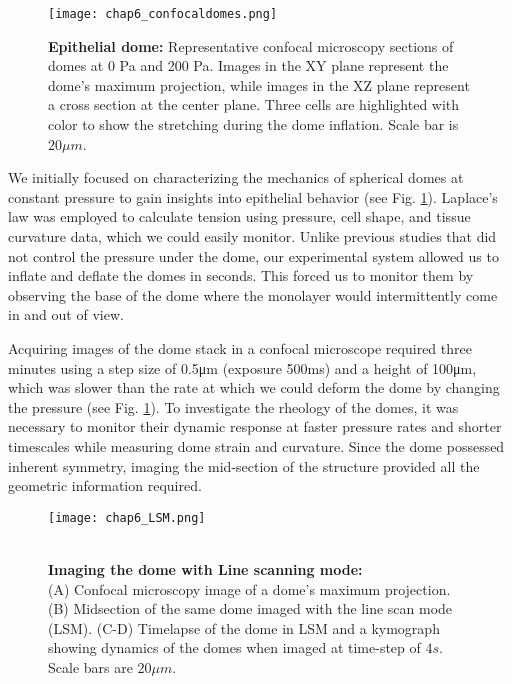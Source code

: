 \begin{figure}[h!]
	\centering
	\texttt{[image: chap6\_confocaldomes.png]}
	\caption{\textbf{Epithelial dome:} Representative confocal microscopy sections of domes at 0 Pa and 200 Pa. Images in the XY plane represent the dome's maximum projection, while images in the XZ plane represent a cross section at the center plane. Three cells are highlighted with color to show the stretching during the dome inflation. Scale bar is $20 \mu m$.
	} \label{fig_6_6}
\end{figure}
\clearpage

We initially focused on characterizing the mechanics of spherical domes at constant pressure to gain insights into epithelial behavior (see Fig. \ref{fig_6_6}). Laplace's law was employed to calculate tension using pressure, cell shape, and tissue curvature data, which we could easily monitor. Unlike previous studies that did not control the pressure under the dome, our experimental system allowed us to inflate and deflate the domes in seconds. This forced us to monitor them by observing the base of the dome where the monolayer would intermittently come in and out of view.

Acquiring images of the dome stack in a confocal microscope required three minutes using a step size of 0.5\unit{\um} (exposure 500\unit{\ms}) and a height of 100\unit{\um}, which was slower than the rate at which we could deform the dome by changing the pressure (see Fig. \ref{fig_6_6}). To investigate the rheology of the domes, it was necessary to monitor their dynamic response at faster pressure rates and shorter timescales while measuring dome strain and curvature. Since the dome possessed inherent symmetry, imaging the mid-section of the structure provided all the geometric information required.

\begin{figure}[h!]
	\begin{minipage}[c]{0.6\textwidth}
		\texttt{[image: chap6\_LSM.png]}
	\end{minipage}\hfill
	\begin{minipage}[c]{0.35\textwidth}
		\caption{\\ \textbf{Imaging the dome with Line scanning mode:}\\ (A) Confocal microscopy image of a dome's maximum projection. (B) Midsection of the same dome imaged with the line scan mode (LSM). (C-D) Timelapse of the dome in LSM and a kymograph showing dynamics of the domes when imaged at time-step of $4s$. Scale bars are $20 \mu m$.
		} \label{fig_6_7}
	\end{minipage}
\end{figure}

